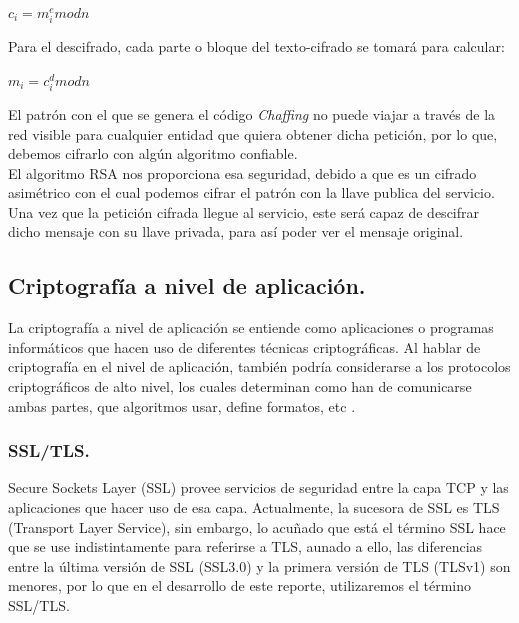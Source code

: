 \documentclass[12pt, a4paper, titlepage]{report}
\begin{document}
		    \begin{center}
		        $c_i=m^{e}_imodn$
		    \end{center}
		    
		    Para el descifrado, cada parte o bloque del texto-cifrado se tomará para calcular:
		    
		    \begin{center}
		        $m_i=c^{d}_imodn$
		    \end{center}
		    
		    El patrón con el que se genera el código \textit{Chaffing} no puede viajar a través de la red visible para cualquier entidad que quiera obtener dicha petición, por lo que, debemos cifrarlo con algún algoritmo confiable.\\
		    El algoritmo RSA nos proporciona esa seguridad, debido a que es un cifrado asimétrico con el cual podemos cifrar el patrón con la llave publica del servicio. Una vez que la petición cifrada llegue al servicio, este será capaz de descifrar dicho mensaje con su llave privada, para así poder ver el mensaje original.\\
        		
	   
            
            \subsection{Criptografía a nivel de aplicación.}
                La criptografía a nivel de aplicación se entiende como aplicaciones o programas informáticos que hacen uso de diferentes técnicas criptográficas. Al hablar de criptografía en el nivel de aplicación, también podría considerarse a los protocolos criptográficos de alto nivel, los cuales determinan como han de comunicarse ambas partes, que algoritmos usar, define formatos, etc \cite{refCriptografia}.
                
                \subsubsection{SSL/TLS.}
                Secure Sockets Layer (SSL) provee servicios de seguridad entre la capa TCP y las aplicaciones que hacer uso de esa capa. Actualmente, la sucesora de SSL es TLS (Transport Layer Service), sin embargo, lo acuñado que está el término SSL hace que se use indistintamente para referirse a TLS, aunado a ello, las diferencias entre la última versión de SSL (SSL3.0) y la primera versión de TLS (TLSv1) son menores, por lo que en el desarrollo de este reporte, utilizaremos el término SSL/TLS.\\
                
\end{document}
